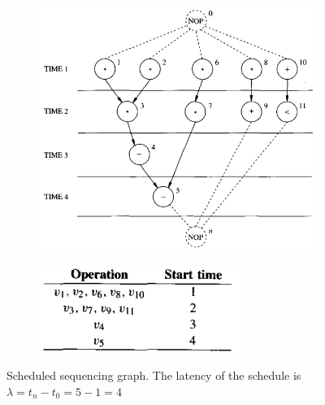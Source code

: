 \begin{figure}[H]
    \centering
    \begin{subfigure}[b]{0.4\textwidth}
        \includegraphics[width=\textwidth]{./Cap3/Images/Image17.png}
    \end{subfigure}
    \quad\quad\quad
    \begin{subfigure}[b]{0.4\textwidth}
        \includegraphics[width=\textwidth]{./Cap3/Images/Image18.png}
    \end{subfigure}
    \caption[Optional caption]{Scheduled  sequencing  graph. The latency of the schedule is $ \lambda=t_{n}-t_{0} = 5-1=4 $}
    \label{fig:ExaSeq}
\end{figure}
